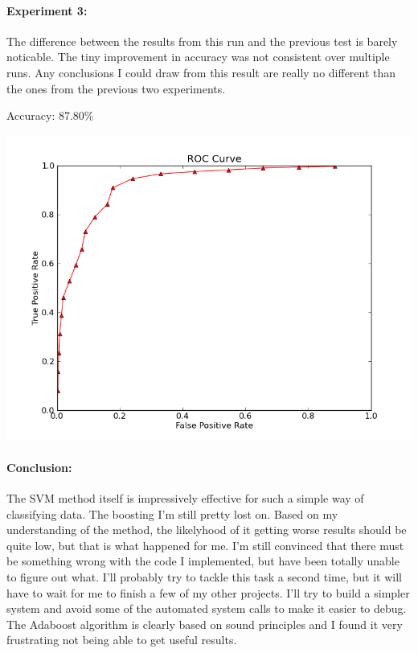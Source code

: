 \documentclass[11pt]{article}
\begin{document}
\paragraph{Experiment 3:} The difference between the results from this run and the previous test is barely noticable.  The tiny improvement in accuracy was not consistent over multiple runs.  Any conclusions I could draw from this result are really no different than the ones from the previous two experiments.
\begin{center}
  Accuracy: 87.80\%
\end{center}

\begin{center}
  \includegraphics[width=6.0in]{q3curve.png}
\end{center}

\paragraph{Conclusion:} The SVM method itself is impressively effective for such a simple way of classifying data.  The boosting I'm still pretty lost on.  Based on my understanding of the method, the likelyhood of it getting worse results should be quite low, but that is what happened for me.  I'm still convinced that there must be something wrong with the code I implemented, but have been totally unable to figure out what.  I'll probably try to tackle this task a second time, but it will have to wait for me to finish a few of my other projects.  I'll try to build a simpler system and avoid some of the automated system calls to make it easier to debug.  The Adaboost algorithm is clearly based on sound principles and I found it very frustrating not being able to get useful results.
\end{document}
